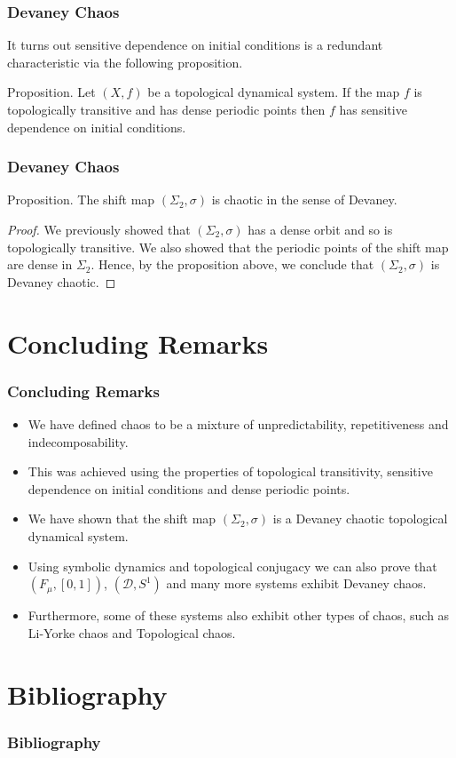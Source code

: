 \documentclass{beamer}
\begin{document}
\begin{frame}
    \frametitle{Devaney Chaos}
    It turns out sensitive dependence on initial conditions is a redundant characteristic via the following proposition.
    \vspace{0.5cm}
    \begin{block}{Proposition.}
        Let $(X, f)$ be a topological dynamical system. If the map $f$ is topologically transitive and has dense periodic points then $f$ has sensitive dependence on initial conditions. \cite{bbcds} \cite{glasner-weiss}
    \end{block}
\end{frame}

\begin{frame}
    \frametitle{Devaney Chaos}
    \begin{block}{Proposition.}
        The shift map $(\Sigma_2, \sigma)$ is chaotic in the sense of Devaney.
        \begin{proof}
            We previously showed that $(\Sigma_2, \sigma)$ has a dense orbit and so is topologically transitive. We also showed that the periodic points of the shift map are dense in $\Sigma_2$. Hence, by the proposition above, we conclude that $(\Sigma_2, \sigma)$ is Devaney chaotic.
        \end{proof}
    \end{block}
\end{frame}

\section{Concluding Remarks}
\begin{frame}
    \frametitle{Concluding Remarks}
    \begin{itemize}
        \item We have defined chaos to be a mixture of unpredictability, repetitiveness and indecomposability.
        \item This was achieved using the properties of topological transitivity, sensitive dependence on initial conditions and dense periodic points.
        \item We have shown that the shift map $(\Sigma_2, \sigma)$ is a Devaney chaotic topological dynamical system.
        \item Using symbolic dynamics and topological conjugacy we can also prove that $(F_\mu, [0, 1])$, $(\mathcal{D}, S^1)$ and many more systems exhibit Devaney chaos.
        \item Furthermore, some of these systems also exhibit other types of chaos, such as Li-Yorke chaos and Topological chaos.
    \end{itemize}
\end{frame}

\section{Bibliography}
\begin{frame}
    \frametitle{Bibliography}
    
\end{frame}
\end{document}
